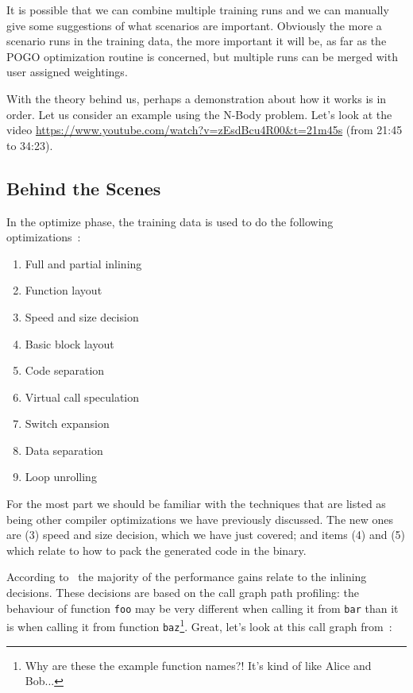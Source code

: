 \documentclass[a4paper]{report}
\begin{document}
It is possible that we can combine multiple training runs and we can manually give some suggestions of what scenarios are important. Obviously the more a scenario runs in the training data, the more important it will be, as far as the POGO optimization routine is concerned, but multiple runs can be merged with user assigned weightings.

With the theory behind us, perhaps a demonstration about how it works is in order. Let us consider an example using the N-Body problem. Let's look at the video \url{https://www.youtube.com/watch?v=zEsdBcu4R00&t=21m45s} (from 21:45 to 34:23).


\subsection*{Behind the Scenes}

In the optimize phase, the training data is used to do the following optimizations~\cite{pogo2}:

\begin{multicols}{2}
\begin{enumerate}
\item Full and partial inlining
\item Function layout
\item Speed and size decision
\item Basic block layout 
\item Code separation
\item Virtual call speculation
\item Switch expansion
\item Data separation
\item Loop unrolling
\end{enumerate}
\end{multicols}

For the most part we should be familiar with the techniques that are listed as being other compiler optimizations we have previously discussed. The new ones are (3) speed and size decision, which we have just covered; and items (4) and (5) which relate to how to pack the generated code in the binary.

According to~\cite{pogo2} the majority of the performance gains relate to the inlining decisions. These decisions are based on the call graph path profiling: the behaviour of function \texttt{foo} may be very different when calling it from \texttt{bar} than it is when calling it from function \texttt{baz}\footnote{Why are these the example function names?! It's kind of like Alice and Bob...}. Great, let's look at this call graph from~\cite{pogo2}:
\end{document}
